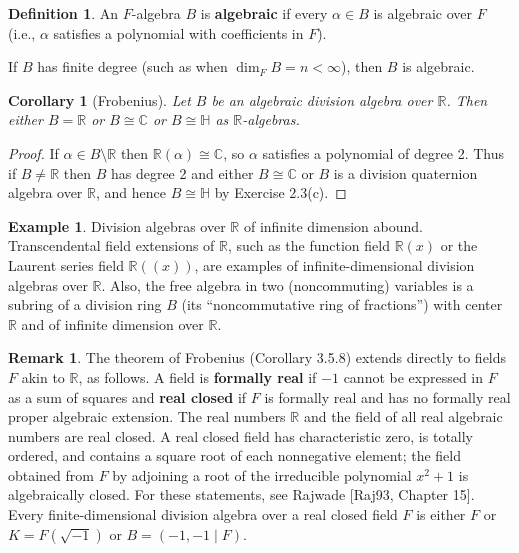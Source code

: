 \documentclass{article}
\newtheorem{corollary}[theorem]{Corollary}
\theoremstyle{definition}
\newtheorem{definition}[theorem]{Definition}
\newtheorem{example}[theorem]{Example}
\newtheorem{remark}[theorem]{Remark}
\begin{document}
\begin{definition}
An $F$-algebra $B$ is \textbf{algebraic} if every $\alpha \in B$ is algebraic over $F$ (i.e., $\alpha$ satisfies a polynomial with coefficients in $F$).
\end{definition}

If $B$ has finite degree (such as when $\dim_F B = n < \infty$), then $B$ is algebraic.

\begin{corollary}[Frobenius]
Let $B$ be an algebraic division algebra over $\mathbb{R}$. Then either $B = \mathbb{R}$ or $B \cong \mathbb{C}$ or $B \cong \mathbb{H}$ as $\mathbb{R}$-algebras.
\end{corollary}

\begin{proof}
If $\alpha \in B \setminus \mathbb{R}$ then $\mathbb{R}(\alpha) \cong \mathbb{C}$, so $\alpha$ satisfies a polynomial of degree 2. Thus if $B \neq \mathbb{R}$ then $B$ has degree 2 and either $B \cong \mathbb{C}$ or $B$ is a division quaternion algebra over $\mathbb{R}$, and hence $B \cong \mathbb{H}$ by Exercise 2.3(c).
\end{proof}

\begin{example}
Division algebras over $\mathbb{R}$ of infinite dimension abound. Transcendental field extensions of $\mathbb{R}$, such as the function field $\mathbb{R}(x)$ or the Laurent series field $\mathbb{R}((x))$, are examples of infinite-dimensional division algebras over $\mathbb{R}$. Also, the free algebra in two (noncommuting) variables is a subring of a division ring $B$ (its ``noncommutative ring of fractions'') with center $\mathbb{R}$ and of infinite dimension over $\mathbb{R}$.
\end{example}

\begin{remark}
The theorem of Frobenius (Corollary 3.5.8) extends directly to fields $F$ akin to $\mathbb{R}$, as follows. A field is \textbf{formally real} if $-1$ cannot be expressed in $F$ as a sum of squares and \textbf{real closed} if $F$ is formally real and has no formally real proper algebraic extension. The real numbers $\mathbb{R}$ and the field of all real algebraic numbers are real closed. A real closed field has characteristic zero, is totally ordered, and contains a square root of each nonnegative element; the field obtained from $F$ by adjoining a root of the irreducible polynomial $x^2 + 1$ is algebraically closed. For these statements, see Rajwade [Raj93, Chapter 15]. Every finite-dimensional division algebra over a real closed field $F$ is either $F$ or $K = F(\sqrt{-1})$ or $B = (-1, -1 \mid F)$.
\end{remark}
\end{document}
